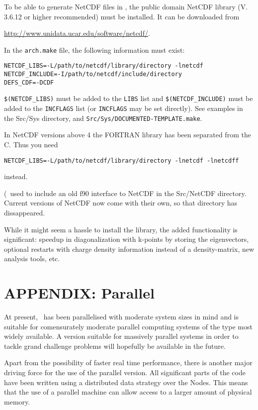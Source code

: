 To be able to generate NetCDF files in \siesta, the public domain
NetCDF library (V. 3.6.12 or higher recommended) must be installed. It can be
downloaded from

\url{http://www.unidata.ucar.edu/software/netcdf/}.

In the \texttt{arch.make} file, the following information must exist:
\begin{verbatim}
NETCDF_LIBS=-L/path/to/netcdf/library/directory -lnetcdf
NETCDF_INCLUDE=-I/path/to/netcdf/include/directory
DEFS_CDF=-DCDF
\end{verbatim}
\texttt{\$(NETCDF\_LIBS)} must be added to the \texttt{LIBS} list and
\texttt{\$(NETCDF\_INCLUDE)} must be added to the \texttt{INCFLAGS} list (or
\texttt{INCFLAGS} may be set directly). See examples in the Src/Sys
directory, and \texttt{Src/Sys/DOCUMENTED-TEMPLATE.make}.

In NetCDF versions above 4 the FORTRAN library has been separated 
from the C. Thus you need
\begin{verbatim}
NETCDF_LIBS=-L/path/to/netcdf/library/directory -lnetcdf -lnetcdff
\end{verbatim}
instead.

(\siesta\ used to include an old f90 interface to NetCDF in the
Src/NetCDF directory. Current versions of NetCDF now come with their
own, so that directory has dissappeared.

While it might seem a hassle to install the library, the added
functionality is significant: speedup in diagonalization with k-points
by storing the eigenvectors, optional restarts with charge density
information instead of a density-matrix, new analysis tools, etc.


\newpage
\section{APPENDIX: Parallel \texorpdfstring{\siesta}{SIESTA}}
\label{sec:parallel}

At present, \siesta\ has been parallelised with moderate system sizes
in mind and is suitable for comensurately moderate parallel computing
systems of the type most widely available. A version suitable for
massively parallel systems in order to tackle grand challenge problems
will hopefully be available in the future.

Apart from the possibility of faster real time performance, there is
another major driving force for the use of the parallel version. All
significant parts of the code have been written using a distributed
data strategy over the Nodes. This means that the use of a parallel
machine can allow access to a larger amount of physical memory.

